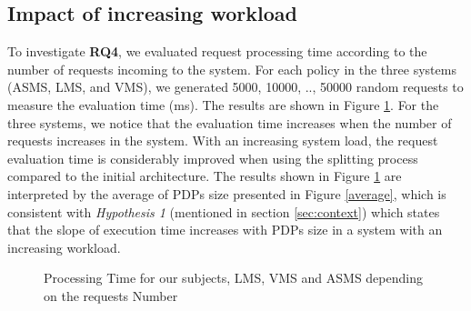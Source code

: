 \subsection{Impact of increasing workload}\label{subsec:Systemworkload}
To investigate \textbf{RQ4}, we evaluated request processing time according to the number of requests incoming to the system. 
For each policy in the three systems (ASMS, LMS, and VMS), we generated 5000, 10000, .., 50000 random requests to measure the evaluation time (ms).
The results are shown in Figure \ref{fig:processing time xengine}. For the three systems, we notice that the evaluation time increases when 
the number of requests increases in the system. With an increasing system load, the request evaluation time is considerably
 improved when using the splitting process compared to the initial architecture. 
The results shown in Figure \ref{fig:processing time xengine} are interpreted by the average of PDPs size presented in 
Figure \ref{average}, which is consistent with \textit{Hypothesis 1} (mentioned in section \ref{sec:context}) 
which states that the slope of execution time increases with PDPs size in a system with an increasing workload.
\begin{figure}
  \centering
  \caption{Processing Time for our subjects, LMS, VMS and ASMS depending on the requests Number}
  \label{fig:processing time xengine}
\end{figure}

